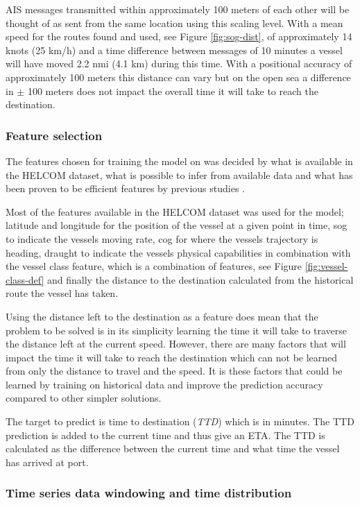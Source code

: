 \documentclass[../main.tex]{subfiles}
\begin{document}
AIS messages transmitted within approximately 100 meters of each other will be thought of as sent from the same location using this scaling level. With a mean speed for the routes found and used, see Figure \ref{fig:sog-dist}, of approximately 14 knots (25 km/h) and a time difference between messages of 10 minutes a vessel will have moved 2.2 nmi (4.1 km) during this time. With a positional accuracy of approximately 100 meters this distance can vary but on the open sea a difference in $\pm$ 100 meters does not impact the overall time it will take to reach the destination.


\subsubsection{Feature selection}

The features chosen for training the model on was decided by what is available in the HELCOM dataset, what is possible to infer from available data and what has been proven to be efficient features by previous studies \cite{El_2020, Jahn_2018}.

Most of the features available in the HELCOM dataset was used for the model; latitude and longitude for the position of the vessel at a given point in time, sog to indicate the vessels moving rate, cog for where the vessels trajectory is heading, draught to indicate the vessels physical capabilities in combination with the vessel class feature, which is a combination of features, see Figure \ref{fig:vessel-class-def} and finally the distance to the destination calculated from the historical route the vessel has taken.

Using the distance left to the destination as a feature does mean that the problem to be solved is in its simplicity learning the time it will take to traverse the distance left at the current speed. However, there are many factors that will impact the time it will take to reach the destination which can not be learned from only the distance to travel and the speed. It is these factors that could be learned by training on historical data and improve the prediction accuracy compared to other simpler solutions.

The target to predict is time to destination (\textit{TTD}) which is in minutes. The TTD prediction is added to the current time and thus give an ETA. The TTD is calculated as the difference between the current time and what time the vessel has arrived at port.

\subsubsection{Time series data windowing and time distribution}
\label{sec:timeseries}
\end{document}
